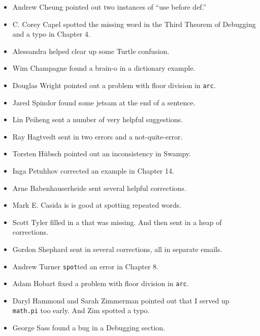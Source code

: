 \documentclass[10pt]{book}
\begin{document}
\begin{itemize}
\item Andrew Cheung pointed out two instances of ``use before def.''

\item C. Corey Capel spotted the missing word in the Third Theorem
of Debugging and a typo in Chapter 4.

\item Alessandra helped clear up some Turtle confusion.

\item Wim Champagne found a brain-o in a dictionary example.

\item Douglas Wright pointed out a problem with floor division in
{\tt arc}.

\item Jared Spindor found some jetsam at the end of a sentence.

\item Lin Peiheng sent a number of very helpful suggestions.

\item Ray Hagtvedt sent in two errors and a not-quite-error.

\item Torsten H\"{u}bsch pointed out an inconsistency in Swampy.

\item Inga Petuhhov corrected an example in Chapter 14.

\item Arne Babenhauserheide sent several helpful corrections.

\item Mark E. Casida is is good at spotting repeated words.

\item Scott Tyler filled in a that was missing.  And then sent in
a heap of corrections.

\item Gordon Shephard sent in several corrections, all in separate
emails.

\item Andrew Turner {\tt spot}ted an error in Chapter 8.

\item Adam Hobart fixed a problem with floor division in {\tt arc}.

\item Daryl Hammond and Sarah Zimmerman pointed out that I served
up {\tt math.pi} too early.  And Zim spotted a typo.

\item George Sass found a bug in a Debugging section.


\end{itemize}
\end{document}
